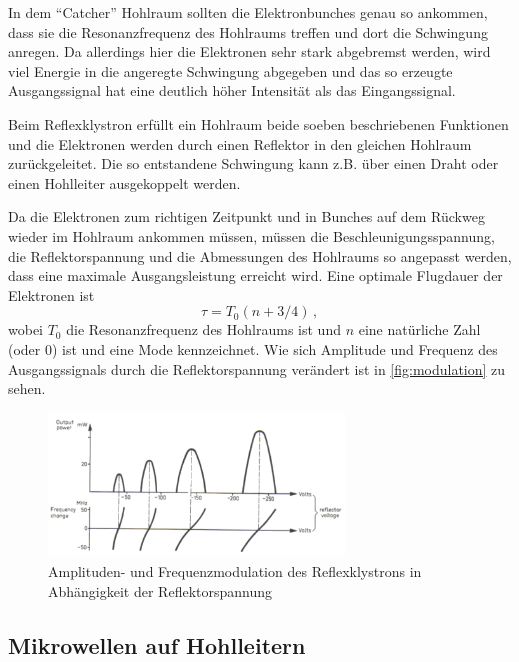 In dem \enquote{Catcher} Hohlraum sollten die Elektronbunches genau so ankommen, dass sie die Resonanzfrequenz des Hohlraums treffen und dort die Schwingung anregen.
Da allerdings hier die Elektronen sehr stark abgebremst werden, wird viel Energie in die angeregte Schwingung abgegeben 
und das so erzeugte Ausgangssignal hat eine deutlich höher Intensität als das Eingangssignal.

Beim Reflexklystron erfüllt ein Hohlraum beide soeben beschriebenen Funktionen und die Elektronen werden durch einen Reflektor in den gleichen Hohlraum zurückgeleitet.
Die so entstandene Schwingung kann z.B. über einen Draht oder einen Hohlleiter ausgekoppelt werden.

Da die Elektronen zum richtigen Zeitpunkt und in Bunches auf dem Rückweg wieder im Hohlraum ankommen müssen, 
müssen die Beschleunigungsspannung, die Reflektorspannung und die Abmessungen des Hohlraums
so angepasst werden, dass eine maximale Ausgangsleistung erreicht wird.
Eine optimale Flugdauer der Elektronen ist 
\begin{equation}
    \tau = T_0 (n+3/4) \, ,
\end{equation}
wobei $T_0$ die Resonanzfrequenz des Hohlraums ist und $n$ eine natürliche Zahl (oder 0) ist und eine Mode kennzeichnet.
Wie sich Amplitude und Frequenz des Ausgangssignals durch die Reflektorspannung verändert ist in \autoref{fig:modulation} zu sehen.

\begin{figure}
    \centering
    \includegraphics[width=0.7\textwidth]{images/modulation_white.png}
    \caption{Amplituden- und Frequenzmodulation des Reflexklystrons in Abhängigkeit der Reflektorspannung \cite{V53_old}}
    \label{fig:modulation}
\end{figure}

\subsection{Mikrowellen auf Hohlleitern}
\label{ssec:Hohlleiter}

